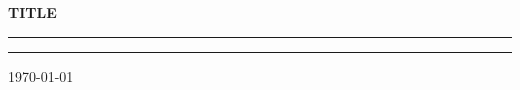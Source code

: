 \documentclass[11pt, oneside]{article}
\begin{document}
\begin{center}
    \vspace*{5cm}
    \LARGE\textbf{TITLE}\normalsize
\end{center}

\hrule
\vspace*{0.05cm}
\hrule

\vspace*{0.1cm}
\begin{center}
    \today
\end{center}

\newpage

\end{document}
